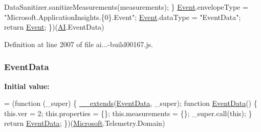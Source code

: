 \begin{DoxyCode}
      DataSanitizer.sanitizeMeasurements(measurements);
                \}
                \hyperlink{obj_2_release_2_package_2_package_tmp_2_scripts_2ai_80_822_89-build00167_8js_aed01caf943a868f8e12e0420da8fa542}{Event}.envelopeType = \textcolor{stringliteral}{"Microsoft.ApplicationInsights.\{0\}.Event"};
                \hyperlink{obj_2_release_2_package_2_package_tmp_2_scripts_2ai_80_822_89-build00167_8js_aed01caf943a868f8e12e0420da8fa542}{Event}.dataType = \textcolor{stringliteral}{"EventData"};
                \textcolor{keywordflow}{return} \hyperlink{obj_2_release_2_package_2_package_tmp_2_scripts_2ai_80_822_89-build00167_8js_aed01caf943a868f8e12e0420da8fa542}{Event};
            \})(\hyperlink{obj_2_release_2_package_2_package_tmp_2_scripts_2ai_80_822_89-build00167_8js_aa840f97564574b54956c385088b90e81}{AI}.EventData)
\end{DoxyCode}


Definition at line 2007 of file ai...-\/build00167.\+js.

\subsubsection[{\texorpdfstring{Event\+Data}{EventData}}]{ Event\+Data}\hypertarget{_scripts_2ai_80_822_89-build00167_8js_a98d9526e051018875c6e50f67c015a42}{}\label{_scripts_2ai_80_822_89-build00167_8js_a98d9526e051018875c6e50f67c015a42}
{\bfseries Initial value\+:}
\begin{DoxyCode}
= (\textcolor{keyword}{function} (\_super) \{
        \hyperlink{obj_2_release_2_package_2_package_tmp_2_scripts_2ai_80_822_89-build00167_8js_ac09f4951ac4b25df0272d4e78ff85ae0}{\_\_extends}(\hyperlink{obj_2_release_2_package_2_package_tmp_2_scripts_2ai_80_822_89-build00167_8js_a98d9526e051018875c6e50f67c015a42}{EventData}, \_super);
        \textcolor{keyword}{function} \hyperlink{obj_2_release_2_package_2_package_tmp_2_scripts_2ai_80_822_89-build00167_8js_a98d9526e051018875c6e50f67c015a42}{EventData}() \{
            this.ver = 2;
            this.properties = \{\};
            this.measurements = \{\};
            \_super.call(\textcolor{keyword}{this});
        \}
        \textcolor{keywordflow}{return} \hyperlink{obj_2_release_2_package_2_package_tmp_2_scripts_2ai_80_822_89-build00167_8js_a98d9526e051018875c6e50f67c015a42}{EventData};
    \})(\hyperlink{obj_2_release_2_package_2_package_tmp_2_scripts_2ai_80_822_89-build00167_8js_af7b21097393c8dc2ece8949358ff0e27}{Microsoft}.Telemetry.Domain)
\end{DoxyCode}


